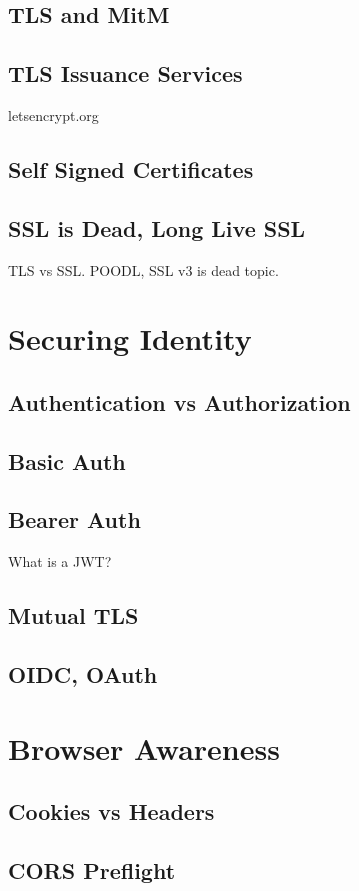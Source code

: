 \documentclass[12pt,oneside]{book} %
\begin{document}
\section{TLS and MitM}
\section{TLS Issuance Services}
letsencrypt.org
\section{Self Signed Certificates}
\section{SSL is Dead, Long Live SSL}
TLS vs SSL.  POODL, SSL v3 is dead topic.

\chapter{Securing Identity}
\section{Authentication vs Authorization}
\section{Basic Auth}
\section{Bearer Auth}
What is a JWT?
\section{Mutual TLS}
\section{OIDC, OAuth}

\chapter{Browser Awareness}
\section{Cookies vs Headers}
\section{CORS Preflight}
\end{document}
